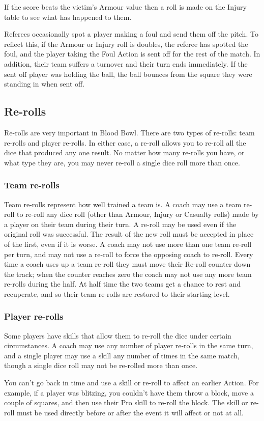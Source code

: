 \documentclass{article}
\begin{document}
\begin{multicols}{2}
\par If the score beats the victim's Armour value then a roll is made on the Injury table to see what has happened to them.
\par Referees occasionally spot a player making a foul and send them off the pitch. To reflect this, if the Armour or Injury roll is doubles, the referee has spotted the foul, and the player taking the Foul Action is sent off for the rest of the match. In addition, their team suffers a turnover and their turn ends immediately. If the sent off player was holding the ball, the ball bounces from the square they were standing in when sent off.

\subsection{Re-rolls}
\par Re-rolls are very important in Blood Bowl. There are two types of re-rolls: team re-rolls and player re-rolls. In either case, a re-roll allows you to re-roll all the dice that produced any one result. No matter how many re-rolls you have, or what type they are, you may never re-roll a single dice roll more than once.

\subsubsection{Team re-rolls}
\par Team re-rolls represent how well trained a team is. A coach may use a team re-roll to re-roll any dice roll (other than Armour, Injury or Casualty rolls) made by a player on their team during their turn. A re-roll may be used even if the original roll was successful. The result of the new roll must be accepted in place of the first, even if it is worse. A coach may not use more than one team re-roll per turn, and may not use a re-roll to force the opposing coach to re-roll. Every time a coach uses up a team re-roll they must move their Re-roll counter down the track; when the counter reaches zero the coach may not use any more team re-rolls during the half. At half time the two teams get a chance to rest and recuperate, and so their team re-rolls are restored to their starting level.

\subsubsection{Player re-rolls}
\par Some players have skills that allow them to re-roll the dice under certain circumstances. A coach may use any number of player re-rolls in the same turn, and a single player may use a skill any number of times in the same match, though a single dice roll may not be re-rolled more than once.
\par You can't go back in time and use a skill or re-roll to affect an earlier Action. For example, if a player was blitzing, you couldn't have them throw a block, move a couple of squares, and then use their Pro skill to re-roll the block. The skill or re-roll must be used directly before or after the event it will affect or not at all.


\end{multicols}
\end{document}
